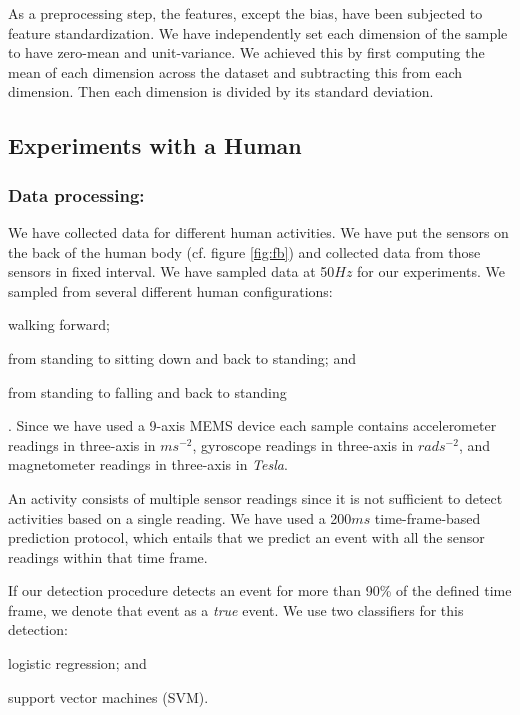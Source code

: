 \documentclass[letterpaper]{article}
\begin{document}
\begin{sloppy}
As a preprocessing step, the features, except the bias, have been subjected to feature 
standardization. We have independently set each dimension of the sample  to have zero-mean and 
unit-variance. We achieved this by first computing the mean of each dimension across the dataset and 
subtracting this from each dimension. Then each dimension is divided by its standard deviation.
 

\subsection{Experiments with a Human}
\subsubsection{Data processing:} 
We have collected data for different human activities. We have put the sensors on the back of the
human body (cf. figure \ref{fig:fb}) and collected data from those sensors in fixed interval. 
We have sampled data at 50$Hz$ for our experiments. We sampled from several different human configurations:
\begin{inparaenum}[(1)] \item walking forward; \item from standing to sitting down and back to standing;
and \item from standing to falling and back to standing\end{inparaenum}. Since we have used a 9-axis MEMS device 
each sample contains accelerometer readings in three-axis in $ms^{-2}$, gyroscope readings in 
three-axis in $rads^{-2}$, and magnetometer readings in three-axis in {\em Tesla}. 

An activity consists of multiple sensor readings since it is not sufficient to detect activities based 
on a single reading. We have used a 200$ms$ time-frame-based prediction protocol, which entails that we
predict an event with all the sensor readings within that time frame. 

If our detection procedure detects an event for more than 90\% of the defined time frame, we denote that 
event as a \textit{true} event. We use two classifiers for this detection: \begin{inparaenum}[1)] 
\item logistic regression; and \item support vector machines (SVM)\cite{Bishop:2006:PRM:1162264}. 
\end{inparaenum} 


\end{sloppy}
\end{document}
